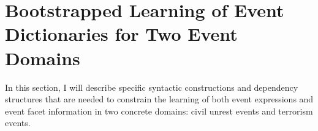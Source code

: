 
%




%







\section{Bootstrapped Learning of Event Dictionaries for Two Event Domains}
In this section, I will describe specific syntactic constructions 
and dependency structures
that are needed to constrain the learning of both 
event expressions and event facet information 
in two concrete domains: civil unrest events 
and terrorism 
events. 

